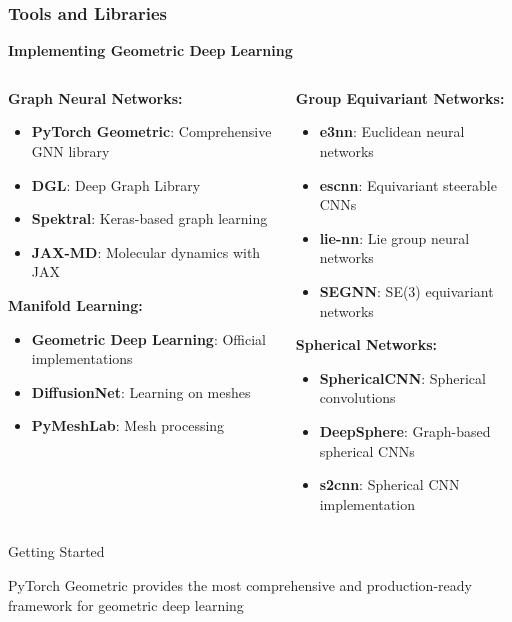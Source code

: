 \begin{frame}[fragile]\frametitle{Tools and Libraries}

\begin{center}
\textbf{Implementing Geometric Deep Learning}
\end{center}

\begin{columns}
\begin{column}{0.5\textwidth}
\textbf{Graph Neural Networks:}
\begin{itemize}
\item \textbf{PyTorch Geometric}: Comprehensive GNN library
\item \textbf{DGL}: Deep Graph Library
\item \textbf{Spektral}: Keras-based graph learning
\item \textbf{JAX-MD}: Molecular dynamics with JAX
\end{itemize}

\textbf{Manifold Learning:}
\begin{itemize}
\item \textbf{Geometric Deep Learning}: Official implementations
\item \textbf{DiffusionNet}: Learning on meshes
\item \textbf{PyMeshLab}: Mesh processing
\end{itemize}
\end{column}
\begin{column}{0.5\textwidth}
\textbf{Group Equivariant Networks:}
\begin{itemize}
\item \textbf{e3nn}: Euclidean neural networks
\item \textbf{escnn}: Equivariant steerable CNNs
\item \textbf{lie-nn}: Lie group neural networks
\item \textbf{SEGNN}: SE(3) equivariant networks
\end{itemize}

\textbf{Spherical Networks:}
\begin{itemize}
\item \textbf{SphericalCNN}: Spherical convolutions
\item \textbf{DeepSphere}: Graph-based spherical CNNs
\item \textbf{s2cnn}: Spherical CNN implementation
\end{itemize}
\end{column}
\end{columns}

\begin{alertblock}{Getting Started}
\begin{center}
PyTorch Geometric provides the most comprehensive and production-ready framework for geometric deep learning
\end{center}
\end{alertblock}

\end{frame}
